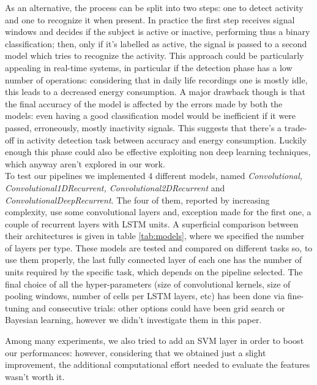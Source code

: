 As an alternative, the process can be split into two steps: one to detect activity and one to recognize it when present. In practice the first step receives signal windows and decides if the subject is active or inactive, performing thus a binary classification; then, only if it’s labelled as active, the signal is passed to a second model which tries to recognize the activity. This approach could be particularly appealing in real-time systems, in particular if the detection phase has a low number of operations: considering that in daily life recordings one is mostly idle, this leads to a decreased energy consumption. A major drawback though is that the final accuracy of the model is affected by the errors made by both the models: even having a good classification model would be inefficient if it were passed, erroneously, mostly inactivity signals. This suggests that there’s a trade-off in activity detection task between accuracy and energy consumption. Luckily enough this phase could also be effective exploiting non deep learning techniques, which anyway aren't explored in our work.\\

To test our pipelines we implemented 4 different models, named \textit{Convolutional, Convolutional1DRecurrent, Convolutional2DRecurrent} and \textit{ConvolutionalDeepRecurrent}. The four of them, reported by increasing complexity, use some convolutional layers and, exception made for the first one, a couple of recurrent layers with LSTM units. A superficial comparison between their architectures is given in table \ref{tab:models}, where we specified the number of layers per type. 
These models are tested and compared on different tasks so, to use them properly, the last fully connected layer of each one has the number of units required by the specific task, which depends on the pipeline selected. The final choice of all the hyper-parameters (size of convolutional kernels, size of pooling windows, number of cells per LSTM layers, etc) has been done via fine-tuning and consecutive trials: other options could have been grid search or Bayesian learning, however we didn't investigate them in this paper.

Among many experiments, we also tried to add an SVM layer in order to boost our performances: however, considering that we obtained just a slight improvement, the additional computational effort needed to evaluate the features wasn't worth it. 
